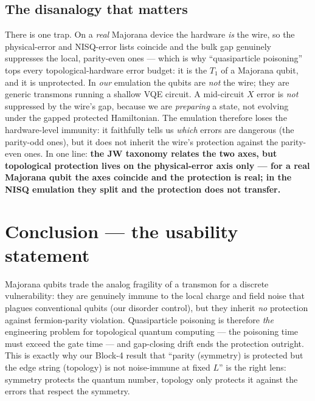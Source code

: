 \documentclass[11pt]{article}
\begin{document}
\subsection{The disanalogy that matters}
There is one trap. On a \emph{real} Majorana device the hardware \emph{is} the wire, so
the physical-error and NISQ-error lists coincide and the bulk gap genuinely suppresses
the local, parity-even ones --- which is why ``quasiparticle poisoning'' tops every
topological-hardware error budget: it is the $T_1$ of a Majorana qubit, and it is
unprotected. In \emph{our} emulation the qubits are \emph{not} the wire; they are
generic transmons running a shallow VQE circuit. A mid-circuit $X$ error is \emph{not}
suppressed by the wire's gap, because we are \emph{preparing} a state, not evolving
under the gapped protected Hamiltonian. The emulation therefore loses the
hardware-level immunity: it faithfully tells us \emph{which} errors are dangerous (the
parity-odd ones), but it does not inherit the wire's protection against the
parity-even ones. In one line: \textbf{the JW taxonomy relates the two axes, but
topological protection lives on the physical-error axis only --- for a real Majorana
qubit the axes coincide and the protection is real; in the NISQ emulation they split
and the protection does not transfer.}

\section{Conclusion --- the usability statement}
Majorana qubits trade the analog fragility of a transmon for a discrete
vulnerability: they are genuinely immune to the local charge and field noise that
plagues conventional qubits (our disorder control), but they inherit \emph{no}
protection against fermion-parity violation. Quasiparticle poisoning is therefore
\emph{the} engineering problem for topological quantum computing --- the poisoning
time must exceed the gate time --- and gap-closing drift ends the protection
outright. This is exactly why our Block-4 result that ``parity (symmetry) is
protected but the edge string (topology) is not noise-immune at fixed $L$'' is the
right lens: symmetry protects the quantum number, topology only protects it
against the errors that respect the symmetry.
\end{document}
